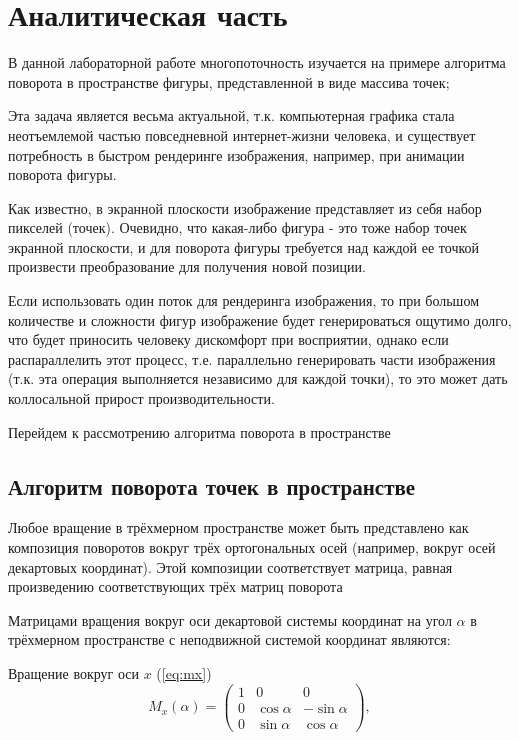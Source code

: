 \chapter{Аналитическая часть}

В данной лабораторной работе многопоточность изучается на при­мере 
алгоритма поворота в пространстве фигуры, представленной в виде массива точек;

Эта задача является весьма актуальной, т.к. компьютерная графи­ка
стала неотъемлемой частью повседневной интернет-жизни человека, и
существует потребность в быстром рендеринге изображения, например,
при анимации поворота фигуры.

Как известно, в экранной плоскости изображение представляет
из себя набор пикселей (точек). Очевидно, что какая-либо фигура - это
тоже набор точек экранной плоскости, и для поворота фигуры требуется
над каждой ее точкой произвести преобразование для получения новой
позиции.

Если использовать один поток для рендеринга изображения, то
при большом количестве и сложности фигур изображение будет 
генери­роваться ощутимо долго, что будет приносить человеку дискомфорт при
восприятии, однако если распараллелить этот процесс, т.е. параллельно
генерировать части изображения (т.к. эта операция выполняется
 неза­висимо для каждой точки), то это может дать коллосальной прирост
производительности.

Перейдем к рассмотрению алгоритма поворота в пространстве\cite{alg}

\section{Алгоритм поворота точек в пространстве}

Любое вращение в трёхмерном пространстве может быть представлено 
как композиция поворотов вокруг трёх ортогональных осей 
(например, вокруг осей декартовых координат). Этой композиции 
соответствует матрица, равная произведению соответствующих трёх
 матриц поворота \cite{math}


Матрицами вращения вокруг оси декартовой системы координат на угол 
$\alpha$ в трёхмерном пространстве с неподвижной системой координат 
являются:

Вращение вокруг оси $x$ (\ref{eq:mx})
\begin{equation}
	\label{eq:mx}
	M_{x}(\alpha) = \begin{pmatrix}
		1 & 0  & 0\\
		0 & \cos\alpha  & -\sin\alpha\\
		0 & \sin\alpha  & \cos\alpha
	\end{pmatrix},
\end{equation}


